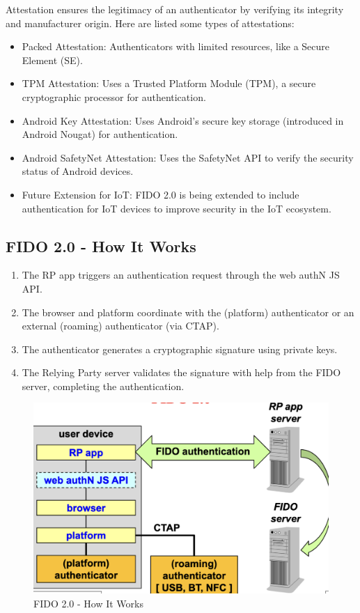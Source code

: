 Attestation ensures the legitimacy of an authenticator by verifying its integrity and manufacturer origin. Here are listed some types of attestations:
\begin{itemize}
    \item Packed Attestation: Authenticators with limited resources, like a Secure Element (SE).
    \item TPM Attestation: Uses a Trusted Platform Module (TPM), a secure cryptographic processor for authentication.
    \item Android Key Attestation: Uses Android's secure key storage (introduced in Android Nougat) for authentication.
    \item Android SafetyNet Attestation: Uses the SafetyNet API to verify the security status of Android devices.
    \item Future Extension for IoT: FIDO 2.0 is being extended to include authentication for IoT devices to improve security in the IoT ecosystem.
\end{itemize}

\subsection*{FIDO 2.0 - How It Works}
\begin{enumerate}
    \item The RP app triggers an authentication request through the web authN JS API.
    \item The browser and platform coordinate with the (platform) authenticator or an external (roaming) authenticator (via CTAP).
    \item The authenticator generates a cryptographic signature using private keys.
    \item The Relying Party server validates the signature with help from the FIDO server, completing the authentication.
\end{enumerate}

\begin{figure}[H]
    \centering
    \includegraphics[width=0.5\linewidth]{Images/Authentication/fido2.png}
    \caption{FIDO 2.0 - How It Works}
\end{figure}